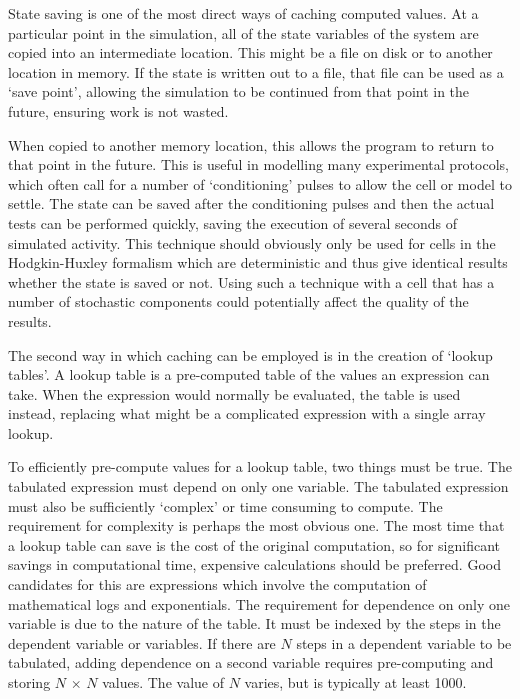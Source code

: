 State saving is one of the most direct ways of caching computed values.  At a
particular point in the simulation, all of the state variables of the
system are copied into an intermediate location.  This might be a file on disk or
to another location in memory.  If the state is written out to a file, that file can
be used as a `save point', allowing the simulation to be continued from that
point in the future, ensuring work is not wasted.

When copied to another memory location, this allows the program to return to
that point in the future.  This is useful in modelling many experimental
protocols, which often call for a number of `conditioning' pulses to allow the
cell or model to settle.  The state can be saved after the conditioning pulses
and then the actual tests can be performed quickly, saving the execution of
several seconds of simulated activity.  This technique should obviously only be
used for cells in the Hodgkin-Huxley formalism which are deterministic and thus
give identical results whether the state is saved or not.  Using such a
technique with a cell that has a number of stochastic components could
potentially affect the quality of the results.

The second way in which caching can be employed is in the creation of `lookup
tables'.
A lookup table is a pre-computed table of the values an expression can
take.
When the expression would normally be evaluated, the table is used
instead, replacing what might be a complicated expression with a single array
lookup.

To efficiently pre-compute values for a lookup table, two things must be true.
The tabulated expression must depend on only one variable.
The tabulated expression must also be sufficiently `complex' or time consuming
to compute.
The requirement for complexity is perhaps the most obvious one.
The most time that a lookup table can save is the cost of the original
computation, so for significant savings in computational time, expensive
calculations should be preferred.
Good candidates for this are expressions which involve the computation of
mathematical logs and exponentials.
The requirement for dependence on only one variable is due to the nature of the
table.
It must be indexed by the steps in the dependent variable or variables.
If there are $N$ steps in a dependent variable to be tabulated, adding
dependence on a second variable requires pre-computing and storing
$N\,\times\,N$ values.
The value of $N$ varies, but is typically at least 1000.

